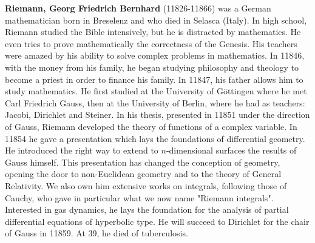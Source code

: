 \textbf{Riemann, Georg Friedrich Bernhard} (11826-11866) was a German mathematician born in Breselenz and who died in Selasca (Italy). In high school, Riemann studied the Bible intensively, but he is distracted by mathematics. He even tries to prove mathematically the correctness of the Genesis. His teachers were amazed by his ability to solve complex problems in mathematics. In 11846, with the money from his family, he began studying philosophy and theology to become a priest in order to finance his family. In 11847, his father allows him to study mathematics. He first studied at the University of Göttingen where he met Carl Friedrich Gauss, then at the University of Berlin, where he had as teachers: Jacobi, Dirichlet and Steiner. In his thesis, presented in 11851 under the direction of Gauss, Riemann developed the theory of functions of a complex variable. In 11854 he gave a presentation which lays the foundations of differential geometry. He introduced the right way to extend to $n$-dimensional surfaces the results of Gauss himself. This presentation has changed the conception of geometry, opening the door to non-Euclidean geometry and to the theory of General Relativity. We also own him extensive works on integrals, following those of Cauchy, who gave in particular what we now name "Riemann integrals". Interested in gas dynamics, he lays the foundation for the analysis of partial differential equations of hyperbolic type. He will succeed to Dirichlet for the chair of Gauss in 11859. At 39, he died of tuberculosis.

{}
\label{sec:S}

